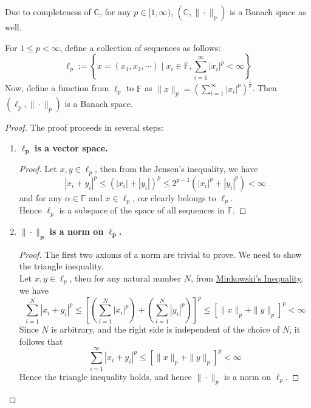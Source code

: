 \begin{note}
    Due to completeness of $\mathbb{C}$, for any $p\in[1,\infty)$, $(\mathbb{C},\|\cdot\|_{p})$ is a Banach space as well.
\end{note}
\vspace{0.4cm}
\begin{eg}
    For $1\leq p<\infty$, define a collection of sequences as follows:$$\ell_{p}:=\left\{x=(x_{1},x_{2},\cdots)\mid x_{i}\in\mathbb{F}, \sum_{i=1}^{\infty}|x_{i}|^{p}<\infty\right\}$$
    Now, define a function from $\ell_{p}$ to $\mathbb{F}$ as $\|x\|_{p}=\left(\sum_{i=1}^{\infty}|x_{i}|^{p}\right)^{\frac{1}{p}}$. Then $(\ell_{p},\|\cdot\|_{p})$ is a Banach space.
    \begin{proof} The proof proceeds in several steps:
        \begin{enumerate}
            \item $\bm{\ell_{p}}$ \textbf{is a vector space.} 
                \begin{proof}
                    Let $x,y\in\ell_{p}$, then from the Jensen's inequality, we have $$|x_{i}+y_{i}|^{p}\leq(|x_{i}|+|y_{i}|)^{p}\leq 2^{p-1}(|x_{i}|^{p}+|y_{i}|^{p})<\infty$$
                    and for any $\alpha\in \mathbb{F}$ and $x\in\ell_{p}$, $\alpha x$ clearly belongs to $\ell_{p}$.\\ 
                    Hence $\ell_{p}$ is a subspace of the space of all sequences in $\mathbb{F}$.
                \end{proof}
            \item $\bm{\|\cdot\|_{p}}$\textbf{ is a norm on }$\bm{\ell_{p}}$\textbf{.}
                \begin{proof}
                    The first two axioms of a norm are trivial to prove. We need to show the triangle inequality.\\ 
                    Let $x,y\in\ell_{p}$, then for any natural number $N$, from \hyperlink{minkowski}{Minkowski's Inequality}, we have $$\sum_{i=1}^{N}|x_{i}+y_{i}|^{p}\leq\left[\left(\sum_{i=1}^{N}|x_{i}|^{p}\right)+\left(\sum_{i=1}^{N}|y_{i}|^{p}\right)\right]^{p}\leq\left[\|x\|_{p}+\|y\|_{p}\right]^{p}<\infty$$
                    Since $N$ is arbitrary, and the right side is independent of the choice of $N$, it follows that $$\sum_{i=1}^{\infty}|x_{i}+y_{i}|^{p}\leq\left[\|x\|_{p}+\|y\|_{p}\right]^{p}<\infty$$
                    Hence the triangle inequality holds, and hence $\|\cdot\|_{p}$ is a norm on $\ell_{p}$.
                \end{proof}

\end{enumerate}
\end{proof}
\end{eg}
